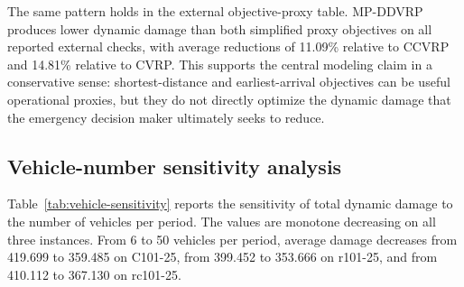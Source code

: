 ﻿\documentclass[preprint,12pt,authoryear]{elsarticle}
\begin{document}
The same pattern holds in the external objective-proxy table. MP-DDVRP produces lower dynamic damage than both simplified proxy objectives on all reported external checks, with average reductions of 11.09\% relative to CCVRP and 14.81\% relative to CVRP. This supports the central modeling claim in a conservative sense: shortest-distance and earliest-arrival objectives can be useful operational proxies, but they do not directly optimize the dynamic damage that the emergency decision maker ultimately seeks to reduce.

\subsection{Vehicle-number sensitivity analysis}
\label{subsec:vehicle-sensitivity}

Table~\ref{tab:vehicle-sensitivity} reports the sensitivity of total dynamic damage to the number of vehicles per period. The values are monotone decreasing on all three instances. From 6 to 50 vehicles per period, average damage decreases from 419.699 to 359.485 on C101-25, from 399.452 to 353.666 on r101-25, and from 410.112 to 367.130 on rc101-25.

\begin{table}[H]
\centering
\caption{Vehicle-number sensitivity results of IHGA.}
\label{tab:vehicle-sensitivity}
\scriptsize
{}
\end{table}
\end{document}
